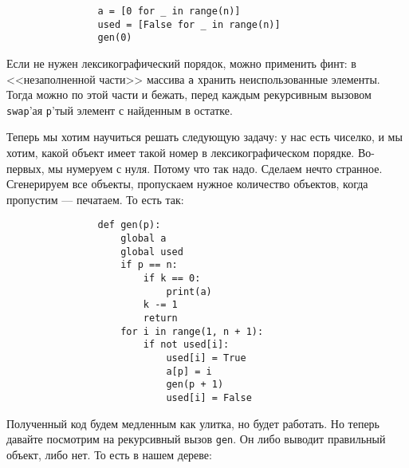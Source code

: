 \documentclass{article}
\begin{document}
\begin{itemize}
\begin{Comment}
\begin{verbatim}
                a = [0 for _ in range(n)]
                used = [False for _ in range(n)]
                gen(0)
            \end{verbatim}
            Если не нужен лексикографический порядок, можно применить финт: в <<незаполненной части>> массива \texttt{a} хранить неиспользованные элементы. Тогда можно по этой части и бежать, перед каждым рекурсивным вызовом \texttt{swap}'ая \texttt{p}'тый элемент с найденным в остатке.
        \end{Comment}
        \begin{Comment}
            Теперь мы хотим научиться решать следующую задачу: у нас есть чиселко, и мы хотим, какой объект имеет такой номер в лексикографическом порядке. Во-первых, мы нумеруем с нуля. Потому что так надо. Сделаем нечто странное. Сгенерируем все объекты, пропускаем нужное количество объектов, когда пропустим --- печатаем. То есть так:
            \begin{verbatim}
                def gen(p):
                    global a
                    global used
                    if p == n:
                        if k == 0:
                            print(a)
                        k -= 1
                        return
                    for i in range(1, n + 1):
                        if not used[i]:
                            used[i] = True
                            a[p] = i
                            gen(p + 1)
                            used[i] = False
            \end{verbatim}
            Полученный код будем медленным как улитка, но будет работать. Но теперь давайте посмотрим на рекурсивный вызов \texttt{gen}. Он либо выводит правильный объект, либо нет. То есть в нашем дереве:
            \begin{center}
\end{center}
\end{Comment}
\end{itemize}
\end{document}
